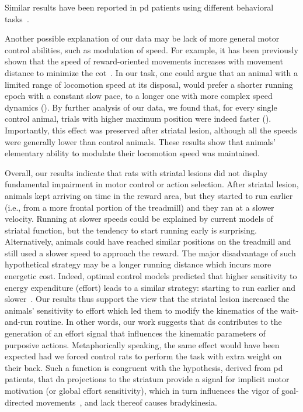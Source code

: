 Similar results have been reported in \gls{pd} patients using different behavioral tasks~\cite{Mazzoni2007, Schmidt2008Brain}.
\par
Another possible explanation of our data may be lack of more general motor control abilities, such as modulation of speed.
For example, it has been previously shown that the speed of reward-oriented movements increases with movement distance to minimize the \gls{cot}~\cite{Shadmehr2010Jneurosci}.
In our task, one could argue that an animal with a limited range of locomotion speed at its disposal, would prefer a shorter running epoch with a constant slow pace, to a longer one with more complex speed dynamics ().
By further analysis of our data, we found that, for every single control animal, trials with higher maximum position were indeed faster ().
Importantly, this effect was preserved after striatal lesion, although all the speeds were generally lower than control animals.
These results show that animals' elementary ability to modulate their locomotion speed was maintained.
\par
Overall, our results indicate that rats with striatal lesions did not display fundamental impairment in motor control or action selection.
After striatal lesion, animals kept arriving on time in the reward area, but they started to run earlier (i.e., from a more frontal portion of the treadmill) and they ran at a slower velocity.\footnotemark
Running at slower speeds could be explained by current models of striatal function, but the tendency to start running early is surprising.
Alternatively, animals could have reached similar positions on the treadmill and still used a slower speed to approach the reward.
The major disadvantage of such hypothetical strategy may be a longer running distance which incurs more energetic cost.
Indeed, optimal control models predicted that higher sensitivity to energy expenditure (effort) leads to a similar strategy: starting to run earlier and slower~\cite{JuradoParras2020}.
Our results thus support the view that the striatal lesion increased the animals' sensitivity to effort which led them to modify the kinematics of the wait-and-run routine.
In other words, our work suggests that \gls{ds} contributes to the generation of an effort signal that influences the kinematic parameters of purposive actions.
Metaphorically speaking, the same effect would have been expected had we forced control rats to perform the task with extra weight on their back.
Such a function is congruent with the hypothesis, derived from \gls{pd} patients, that \gls{da} projections to the striatum provide a signal for implicit motor motivation (or global effort sensitivity), which in turn influences the vigor of goal-directed movements~\cite{Mazzoni2007}, and lack thereof causes bradykinesia.
